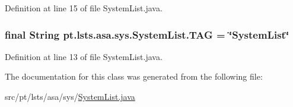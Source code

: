 Definition at line 15 of file System\+List.\+java.

\hypertarget{classpt_1_1lsts_1_1asa_1_1sys_1_1SystemList_a7608c9771fb92071d80375d26d7f6f31}{}
\subsubsection[{T\+A\+G}]{\setlength{\rightskip}{0pt plus 5cm}final String pt.\+lsts.\+asa.\+sys.\+System\+List.\+T\+A\+G = \char`\"{}System\+List\char`\"{}\hspace{0.3cm}{\ttfamily [static]}}\label{classpt_1_1lsts_1_1asa_1_1sys_1_1SystemList_a7608c9771fb92071d80375d26d7f6f31}


Definition at line 13 of file System\+List.\+java.



The documentation for this class was generated from the following file\+:\begin{DoxyCompactItemize}
\item 
src/pt/lsts/asa/sys/\hyperlink{SystemList_8java}{System\+List.\+java}\end{DoxyCompactItemize}
